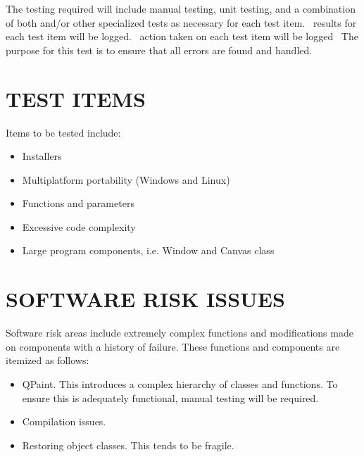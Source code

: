 \documentclass[twoside,letterpaper]{article}
\begin{document}
\bigskip

The testing required will include manual testing, unit testing, and a combination of both and/or other specialized tests as necessary for each test item. 
\ results for each test item will be logged.
\ action taken on each test item will be logged
\ The purpose for this test is to ensure that all errors are found and handled. 

\section[TEST ITEMS]{\bfseries TEST ITEMS}

Items to be tested include:
\begin{itemize}
\item   Installers
\item   Multiplatform portability (Windows and Linux)
\item   Functions and parameters
\item   Excessive code complexity
\item   Large program components, i.e. Window and Canvas class
\end{itemize}

\section[SOFTWARE RISK ISSUES]{\bfseries SOFTWARE RISK ISSUES} 

Software risk areas include extremely complex functions and modifications made on components with a history of failure. These functions and components are itemized as follows: 
\begin{itemize}
\item   QPaint. This introduces a complex hierarchy of classes and functions. To ensure this is adequately functional, manual testing will be required.
\item   Compilation issues.
\item   Restoring object classes. This tends to be fragile.
\end{itemize}
\end{document}

